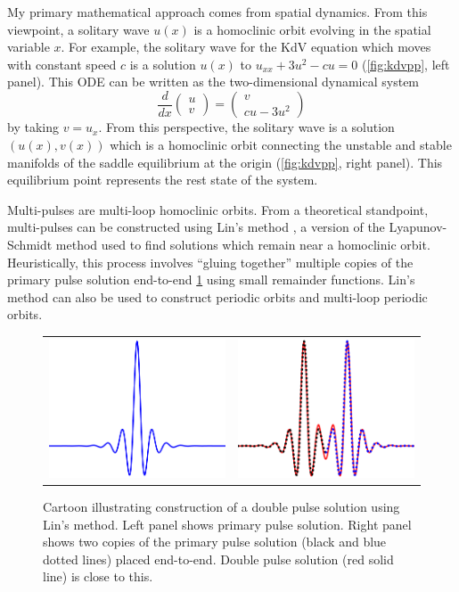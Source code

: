 \documentclass[12pt,reqno,oneside]{article}
\begin{document}
My primary mathematical approach comes from spatial dynamics. From this viewpoint, a solitary wave $u(x)$ is a homoclinic orbit evolving in the spatial variable $x$. For example, the solitary wave for the KdV equation which moves with constant speed $c$ is a solution $u(x)$ to $u_{xx} + 3 u^2 - c u = 0$ (\cref{fig:kdvpp}, left panel). This ODE can be written as the two-dimensional dynamical system 
\[
\frac{d}{dx}\begin{pmatrix}u\\v\end{pmatrix}
= \begin{pmatrix}v \\ cu - 3u^2\end{pmatrix}
\]
by taking $v = u_x$. From this perspective, the solitary wave is a solution $(u(x), v(x))$ which is a homoclinic orbit connecting the unstable and stable manifolds of the saddle equilibrium at the origin (\cref{fig:kdvpp}, right panel). This equilibrium point represents the rest state of the system. 

Multi-pulses are multi-loop homoclinic orbits. From a theoretical standpoint, multi-pulses can be constructed using Lin's method \cite{Lin2008}, a version of the Lyapunov-Schmidt method used to find solutions which remain near a homoclinic orbit. Heuristically, this process involves ``gluing together'' multiple copies of the primary pulse solution end-to-end \cref{fig:linsmethod} using small remainder functions. Lin's method can also be used to construct periodic orbits and multi-loop periodic orbits. 
\begin{figure}
    \centering
    \begin{tabular}{cc}
        \includegraphics[width=6cm]{images/linchen1.png} &
        \includegraphics[width=6cm]{images/linchen2.png} 
    \end{tabular}
    \caption{Cartoon illustrating construction of a double pulse solution using Lin's method. Left panel shows primary pulse solution. Right panel shows two copies of the primary pulse solution (black and blue dotted lines) placed end-to-end. Double pulse solution (red solid line) is close to this.}
    \label{fig:linsmethod}
\end{figure}
\end{document}
